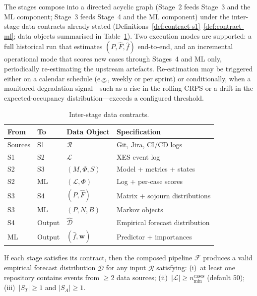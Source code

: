 The stages compose into a directed acyclic graph (Stage~2 feeds Stage~3
and the ML component; Stage~3 feeds Stage~4 and the ML component) under
the inter-stage data contracts already stated
(Definitions~\ref{def:contract-s1}--\ref{def:contract-ml}; data objects
summarised in Table~\ref{tab:data-contracts}). Two execution modes are
supported: a full historical run that estimates $(P, \hat{F}, \hat{f})$
end-to-end, and an incremental operational mode that scores new cases
through Stages~4 and ML only, periodically re-estimating the upstream
artefacts. Re-estimation may be triggered either on a calendar schedule
(e.g., weekly or per sprint) or conditionally, when a monitored degradation
signal---such as a rise in the rolling CRPS or a drift in the
expected-occupancy distribution---exceeds a configured threshold.

\begin{table}[htbp]
\centering
\caption{Inter-stage data contracts.}
\label{tab:data-contracts}
\small
\begin{tabular}{lllp{5cm}}
\toprule
\textbf{From} & \textbf{To} & \textbf{Data Object} & \textbf{Specification} \\
\midrule
Sources & S1     & $\mathcal{R}$        & Git, Jira, CI/CD logs \\
S1      & S2     & $\mathcal{L}$        & XES event log \\
S2      & S3     & $(M, \Phi, S)$       & Model + metrics + states \\
S2      & ML     & $(\mathcal{L}, \Phi)$ & Log + per-case scores \\
S3      & S4     & $(P, \hat{F})$       & Matrix + sojourn distributions \\
S3      & ML     & $(P, N, B)$          & Markov objects \\
S4      & Output & $\hat{\mathcal{D}}$  & Empirical forecast distribution \\
ML      & Output & $(\hat{f}, \mathbf{w})$ & Predictor + importances \\
\bottomrule
\end{tabular}
\end{table}

\begin{proposition}
\label{thm:pipeline-correctness}
If each stage satisfies its contract, then the composed pipeline
$\mathcal{F}$ produces a valid empirical forecast distribution
$\hat{\mathcal{D}}$ for any input $\mathcal{R}$ satisfying:
(i)~at least one repository contains events from $\geq 2$ data sources;
(ii)~$|\mathcal{L}| \geq n_{\min}^{\text{cases}}$ (default 50);
(iii)~$|S_T| \geq 1$ and $|S_A| \geq 1$.
\end{proposition}

